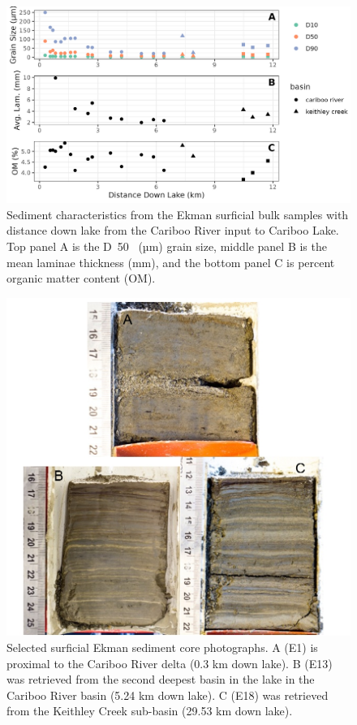 \documentclass[Royal,times,doublespace,sageh]{sagej}
\begin{document}
\begin{figure}

{\centering \includegraphics[width=1\linewidth]{../figs/ekman/ekman_seds} 

}

\caption{Sediment characteristics from the Ekman surficial bulk samples with distance down lake from the Cariboo River input to Cariboo Lake. Top panel A is the D~50~ (µm) grain size, middle panel B is the mean laminae thickness (mm), and the bottom panel C is percent organic matter content (OM).}\label{fig:ekmanSeds}
\end{figure}

\begin{figure}

{\centering \includegraphics[width=1\linewidth]{../figs/ekman/ekman_example} 

}

\caption{Selected surficial Ekman sediment core photographs. A (E1) is proximal to the Cariboo River delta (0.3 km down lake). B (E13) was retrieved from the second deepest basin in the lake in the Cariboo River basin (5.24 km down lake). C (E18) was retrieved from the Keithley Creek sub-basin (29.53 km down lake).}\label{fig:ekmanImgs}
\end{figure}
\end{document}
